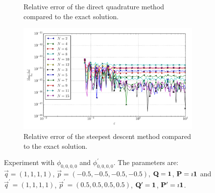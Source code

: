 \documentclass[a4paper,10pt]{article}
\begin{document}
\begin{figure}[ht!]
\begin{subfigure}[t]{0.5\linewidth}
    \caption{Relative error of the direct quadrature method compared to the exact solution.}
    \label{fig:tp_4d_conv_eps_0000_0000_err_rel_qr}
  \end{subfigure}
  \begin{subfigure}[t]{0.5\linewidth}
    \includegraphics[width=\linewidth]{./plots/tp_4d_conv_eps_(0,0,0,0)_(0,0,0,0)_err_rel_nsd.pdf}
    \caption{Relative error of the steepest descent method compared to the exact solution.}
    \label{fig:tp_4d_conv_eps_0000_0000_err_rel_nsd}
  \end{subfigure}
  \label{fig:tp_4d_conv_eps_0000_0000}
  \caption{Experiment with $\phi_{0,0,0,0}$ and $\phi_{0,0,0,0}^{\prime}$.
  The parameters are:
  $\vec{q} = (1, 1, 1, 1)$,
  $\vec{p} = (-0.5, -0.5, -0.5, -0.5)$,
  $\mathbf{Q} = \mathbf{1}$,
  $\mathbf{P} = \imath \mathbf{1}$
  and
  $\vec{q}^\prime = (1, 1, 1, 1)$,
  $\vec{p}^\prime = (0.5, 0.5, 0.5, 0.5)$,
  $\mathbf{Q}^\prime = \mathbf{1}$,
  $\mathbf{P}^\prime = \imath \mathbf{1}$.}
\end{figure}
\end{document}

